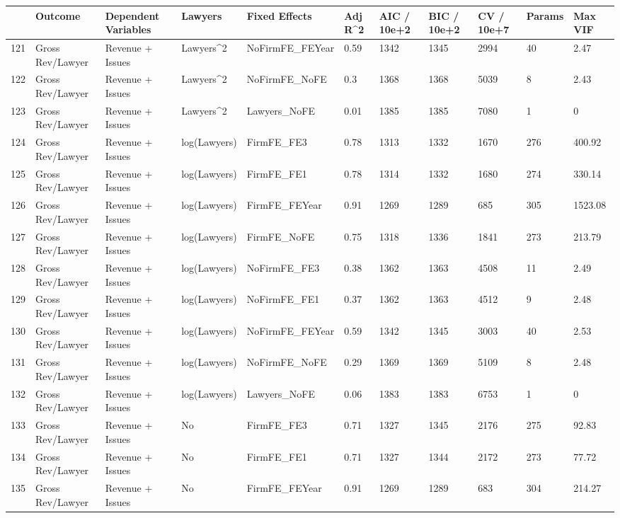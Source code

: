 \documentclass{article}
\begin{document}
\begin{table}[H]
\centering
\begin{tabular}{rllllllllll}
  \hline
 & Outcome & Dependent Variables & Lawyers & Fixed Effects & Adj R^2 & AIC / 10e+2 & BIC / 10e+2 & CV / 10e+7 & Params & Max VIF \\ 
  \hline
121 & Gross Rev/Lawyer & Revenue + Issues & Lawyers^2 & NoFirmFE\_FEYear & 0.59 & 1342 & 1345 & 2994 & 40 & 2.47 \\ 
  122 & Gross Rev/Lawyer & Revenue + Issues & Lawyers^2 & NoFirmFE\_NoFE & 0.3 & 1368 & 1368 & 5039 & 8 & 2.43 \\ 
  123 & Gross Rev/Lawyer & Revenue + Issues & Lawyers^2 & Lawyers\_NoFE & 0.01 & 1385 & 1385 & 7080 & 1 & 0 \\ 
  124 & Gross Rev/Lawyer & Revenue + Issues & log(Lawyers) & FirmFE\_FE3 & 0.78 & 1313 & 1332 & 1670 & 276 & 400.92 \\ 
  125 & Gross Rev/Lawyer & Revenue + Issues & log(Lawyers) & FirmFE\_FE1 & 0.78 & 1314 & 1332 & 1680 & 274 & 330.14 \\ 
  126 & Gross Rev/Lawyer & Revenue + Issues & log(Lawyers) & FirmFE\_FEYear & 0.91 & 1269 & 1289 & 685 & 305 & 1523.08 \\ 
  127 & Gross Rev/Lawyer & Revenue + Issues & log(Lawyers) & FirmFE\_NoFE & 0.75 & 1318 & 1336 & 1841 & 273 & 213.79 \\ 
  128 & Gross Rev/Lawyer & Revenue + Issues & log(Lawyers) & NoFirmFE\_FE3 & 0.38 & 1362 & 1363 & 4508 & 11 & 2.49 \\ 
  129 & Gross Rev/Lawyer & Revenue + Issues & log(Lawyers) & NoFirmFE\_FE1 & 0.37 & 1362 & 1363 & 4512 & 9 & 2.48 \\ 
  130 & Gross Rev/Lawyer & Revenue + Issues & log(Lawyers) & NoFirmFE\_FEYear & 0.59 & 1342 & 1345 & 3003 & 40 & 2.53 \\ 
  131 & Gross Rev/Lawyer & Revenue + Issues & log(Lawyers) & NoFirmFE\_NoFE & 0.29 & 1369 & 1369 & 5109 & 8 & 2.48 \\ 
  132 & Gross Rev/Lawyer & Revenue + Issues & log(Lawyers) & Lawyers\_NoFE & 0.06 & 1383 & 1383 & 6753 & 1 & 0 \\ 
  133 & Gross Rev/Lawyer & Revenue + Issues & No & FirmFE\_FE3 & 0.71 & 1327 & 1345 & 2176 & 275 & 92.83 \\ 
  134 & Gross Rev/Lawyer & Revenue + Issues & No & FirmFE\_FE1 & 0.71 & 1327 & 1344 & 2172 & 273 & 77.72 \\ 
  135 & Gross Rev/Lawyer & Revenue + Issues & No & FirmFE\_FEYear & 0.91 & 1269 & 1289 & 683 & 304 & 214.27 \\ 

\end{tabular}
\end{table}
\end{document}
